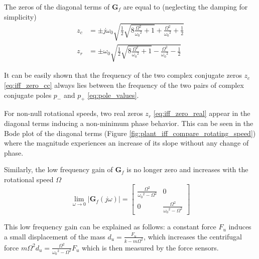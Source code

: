 \documentclass{ISMA_USD2020}
\begin{document}
The zeros of the diagonal terms of \(\bm{G}_f\) are equal to (neglecting the damping for simplicity)
\begin{subequations}
  \begin{align}
    z_c &= \pm j \omega_0 \sqrt{\frac{1}{2} \sqrt{8 \frac{\Omega^2}{{\omega_0}^2} + 1} + \frac{\Omega^2}{{\omega_0}^2} + \frac{1}{2} } \label{eq:iff_zero_cc} \\
    z_r &= \pm   \omega_0 \sqrt{\frac{1}{2} \sqrt{8 \frac{\Omega^2}{{\omega_0}^2} + 1} - \frac{\Omega^2}{{\omega_0}^2} - \frac{1}{2} } \label{eq:iff_zero_real}
  \end{align}
\end{subequations}

It can be easily shown that the frequency of the two complex conjugate zeros \(z_c\) \eqref{eq:iff_zero_cc} always lies between the frequency of the two pairs of complex conjugate poles \(p_{-}\) and \(p_{+}\) \eqref{eq:pole_values}.

For non-null rotational speeds, two real zeros \(z_r\) \eqref{eq:iff_zero_real} appear in the diagonal terms inducing a non-minimum phase behavior.
This can be seen in the Bode plot of the diagonal terms (Figure \ref{fig:plant_iff_compare_rotating_speed}) where the magnitude experiences an increase of its slope without any change of phase.

Similarly, the low frequency gain of \(\bm{G}_f\) is no longer zero and increases with the rotational speed \(\Omega\)
\begin{equation}
\label{low_freq_gain_iff_plan}
  \lim_{\omega \to 0} \left| \bm{G}_f (j\omega) \right| = \begin{bmatrix}
  \frac{\Omega^2}{{\omega_0}^2 - \Omega^2} & 0 \\
  0  & \frac{\Omega^2}{{\omega_0}^2 - \Omega^2}
\end{bmatrix}
\end{equation}

This low frequency gain can be explained as follows: a constant force \(F_u\) induces a small displacement of the mass \(d_u = \frac{F_u}{k - m\Omega^2}\), which increases the centrifugal force \(m\Omega^2d_u = \frac{\Omega^2}{{\omega_0}^2 - \Omega^2} F_u\) which is then measured by the force sensors.
\end{document}
